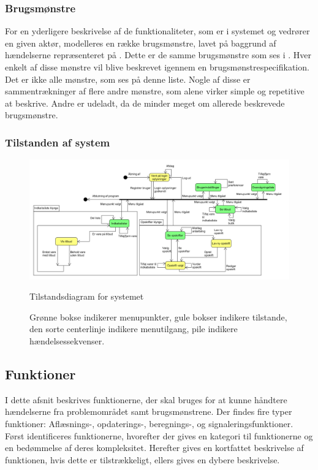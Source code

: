 \subsubsection{Brugsmønstre}
For en yderligere beskrivelse af de funktionaliteter, som er i systemet og vedrører en given aktør, modelleres en række brugsmønstre, lavet på baggrund af hændelserne repræsenteret på .
Dette er de samme brugsmønstre som ses i .
Hver enkelt af disse mønstre vil blive beskrevet igennem en brugsmønstrespecifikation.
Det er ikke alle mønstre, som ses på denne liste.
Nogle af disse er sammentrækninger af flere andre mønstre, som alene virker simple og repetitive at beskrive.
Andre er udeladt, da de minder meget om allerede beskrevede brugsmønstre.



\subsubsection{Tilstanden af system}
\begin{figure}
	\centering
	\includegraphics[scale=0.6, angle=90]{images/Diagrams/Tilstandsdiagram.PNG}
	\caption{Tilstandsdiagram for systemet}
	\caption{Grønne bokse indikerer menupunkter, gule bokser indikere tilstande, den sorte centerlinje indikere menutilgang, pile indikere hændelsessekvenser.}\label{tilstandsdiagram}
\end{figure}



\subsection{Funktioner}\label{subsec:funktioner}

I dette afsnit beskrives funktionerne, der skal bruges for at kunne håndtere hændelserne fra problemområdet samt brugsmønstrene.
Der findes fire typer funktioner: Aflæsnings-, opdaterings-, beregnings-, og signaleringsfunktioner.\citep{OOA&D2001}
Først identificeres funktionerne, hvorefter der gives en kategori til funktionerne og en bedømmelse af deres kompleksitet. 
Herefter gives en kortfattet beskrivelse af funktionen, hvis dette er tilstrækkeligt, ellers gives en dybere beskrivelse.

